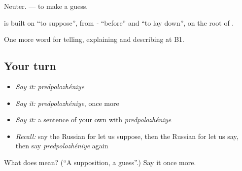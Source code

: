Neuter. \emph{ } — to make a guess.

\begin{cousinweb}
\textbf{} is built on \emph{} \textquotedblleft{}to suppose\textquotedblright{}, from \emph{-} \textquotedblleft{}before\textquotedblright{} and \emph{} \textquotedblleft{}to lay down\textquotedblright{}, on the root of \emph{}.
\end{cousinweb}

\begin{grammarlens}[title={What you've built}]
One more word for telling, explaining and describing at B1.
\end{grammarlens}

\subsection*{Your turn}
\begin{itemize}
\raggedright
  \item \emph{Say it:} \emph{predpolozhéniye}
  \item \emph{Say it:} \emph{predpolozhéniye}, once more
  \item \emph{Say it:} a sentence of your own with \emph{predpolozhéniye}
  \item \emph{Recall:} say the Russian for let us suppose, then the Russian for let us say, then say \emph{predpolozhéniye} again
\end{itemize}

\begin{tcolorbox}[breakable,colback=teal!4,colframe=teal!35!black,title={Before you move on}]
What does  mean? (\textquotedblleft{}A supposition, a guess\textquotedblright{}.) Say it once more.
\end{tcolorbox}
